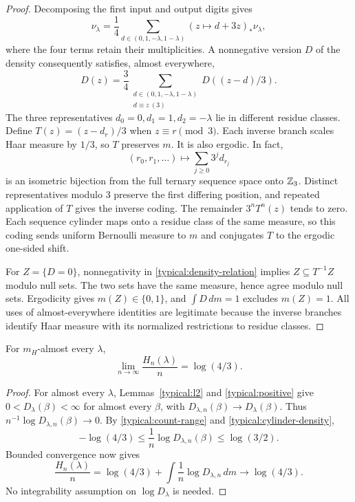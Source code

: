 \begin{proof}
Decomposing the first input and output digits gives
\[
 \nu_\lambda=\frac14
  \sum_{d\in(0,1,-\lambda,1-\lambda)}(z\mapsto d+3z)_*\nu_\lambda,
\]
where the four terms retain their multiplicities. A nonnegative
version $D$ of the density consequently satisfies, almost everywhere,
\begin{equation}\label{typical:density-relation}
 D(z)=\frac34\sum_{\substack{d\in(0,1,-\lambda,1-\lambda)\\
                            d\equiv z\ (3)}}D((z-d)/3).
\end{equation}
The three representatives $d_0=0,d_1=1,d_2=-\lambda$ lie in
different residue classes. Define $T(z)=(z-d_r)/3$ when
$z\equiv r\pmod3$. Each inverse branch scales Haar measure by $1/3$,
so $T$ preserves $m$. It is also ergodic. In fact,
\[
 (r_0,r_1,\ldots)\longmapsto\sum_{j\ge0}3^j d_{r_j}
\]
is an isometric bijection from the full ternary sequence space onto
$\mathbb Z_3$. Distinct representatives modulo $3$ preserve the first
differing position, and repeated application of $T$ gives the inverse
coding. The remainder $3^nT^n(z)$ tends to zero. Each sequence
cylinder maps onto a residue class of the same measure, so this
coding sends uniform Bernoulli measure to $m$ and conjugates $T$
to the ergodic one-sided shift.

For $Z=\{D=0\}$, nonnegativity in
\eqref{typical:density-relation} implies $Z\subseteq T^{-1}Z$
modulo null sets. The two sets have the same measure, hence agree
modulo null sets. Ergodicity gives $m(Z)\in\{0,1\}$, and
$\int D\,dm=1$ excludes $m(Z)=1$. All uses of almost-everywhere
identities are legitimate because the inverse branches identify Haar
measure with its normalized restrictions to residue classes.
\end{proof}

\begin{corollary}
\label{typical:entropy-limit}
For $m_H$-almost every $\lambda$,
\begin{equation}\label{typical:entropy-limit-eq}
 \lim_{n\to\infty}\frac{H_n(\lambda)}n=\log(4/3).
\end{equation}
\end{corollary}

\begin{proof}
For almost every $\lambda$, Lemmas~\ref{typical:l2} and
\ref{typical:positive} give $0<D_\lambda(\beta)<\infty$ for
almost every $\beta$, with $D_{\lambda,n}(\beta)\to D_\lambda(\beta)$.
Thus $n^{-1}\log D_{\lambda,n}(\beta)\to0$. By
\eqref{typical:count-range} and \eqref{typical:cylinder-density},
\[
 -\log(4/3)\le\frac1n\log D_{\lambda,n}(\beta)
              \le\log(3/2).
\]
Bounded convergence now gives
\[
 \frac{H_n(\lambda)}n
 =\log(4/3)+\int\frac1n\log D_{\lambda,n}\,dm
 \longrightarrow\log(4/3).
\]
No integrability assumption on $\log D_\lambda$ is needed.
\end{proof}

